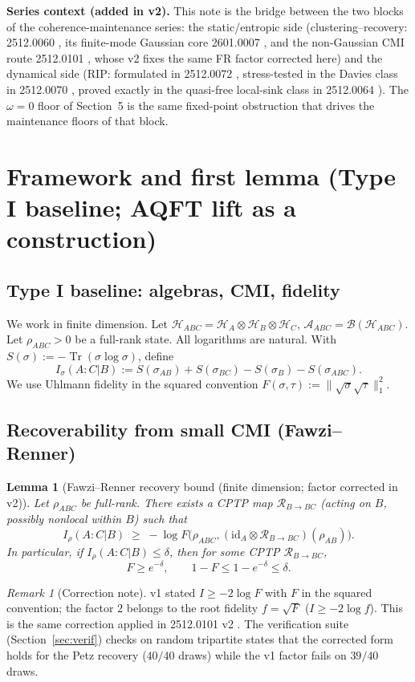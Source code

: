 \documentclass[11pt]{article}
\newtheorem{lemma}[theorem]{Lemma}
\theoremstyle{remark}
\newtheorem{remark}[theorem]{Remark}
\newcommand{\Tr}{\operatorname{Tr}}
\begin{document}
\textbf{Series context (added in v2).} This note is the bridge between the
two blocks of the coherence-maintenance series: the static/entropic side
(clustering--recovery: 2512.0060 \cite{S0060}, its finite-mode Gaussian
core 2601.0007 \cite{S0007}, and the non-Gaussian CMI route 2512.0101
\cite{S0101}, whose v2 fixes the same FR factor corrected here) and the
dynamical side (RIP: formulated in 2512.0072 \cite{S0072}, stress-tested in
the Davies class in 2512.0070 \cite{S0070}, proved exactly in the
quasi-free local-sink class in 2512.0064 \cite{S0064}). The $\omega = 0$
floor of Section~5 is the same fixed-point obstruction that drives the
maintenance floors of that block.

\section{Framework and first lemma (Type I baseline; AQFT lift as a
construction)}

\subsection{Type I baseline: algebras, CMI, fidelity}
We work in finite dimension. Let $\mathcal{H}_{ABC} = \mathcal{H}_A \otimes
\mathcal{H}_B \otimes \mathcal{H}_C$, $\mathcal{A}_{ABC} =
\mathcal{B}(\mathcal{H}_{ABC})$. Let $\rho_{ABC} > 0$ be a full-rank state.
All logarithms are natural. With $S(\sigma) := -\Tr(\sigma\log\sigma)$,
define
\[
I_\sigma(A:C|B) := S(\sigma_{AB}) + S(\sigma_{BC}) - S(\sigma_B)
- S(\sigma_{ABC}).
\]
We use Uhlmann fidelity in the squared convention
$F(\sigma,\tau) := \|\sqrt{\sigma}\sqrt{\tau}\|_1^2$.

\subsection{Recoverability from small CMI (Fawzi--Renner)}
\begin{lemma}[Fawzi--Renner recovery bound (finite dimension; factor
corrected in v2)]
\label{lem:fr}
Let $\rho_{ABC}$ be full-rank. There exists a CPTP map
$\mathcal{R}_{B\to BC}$ (acting on $B$, possibly nonlocal within $B$) such
that
\[
I_\rho(A:C|B) \;\ge\; -\log F\bigl(\rho_{ABC},
(\mathrm{id}_A \otimes \mathcal{R}_{B\to BC})(\rho_{AB})\bigr).
\]
In particular, if $I_\rho(A:C|B) \le \delta$, then for some CPTP
$\mathcal{R}_{B\to BC}$,
\[
F \ge e^{-\delta},
\qquad
1 - F \le 1 - e^{-\delta} \le \delta .
\]
\end{lemma}
\begin{remark}[Correction note]
\label{rem:frfix}
v1 stated $I \ge -2\log F$ with $F$ in the squared convention; the factor
$2$ belongs to the root fidelity $f = \sqrt{F}$
($I \ge -2\log f$). This is the same correction applied in 2512.0101 v2
\cite{S0101}. The verification suite (Section~\ref{sec:verif}) checks on
random tripartite states that the corrected form holds for the Petz
recovery ($40/40$ draws) while the v1 factor fails on $39/40$ draws.
\end{remark}
\end{document}
